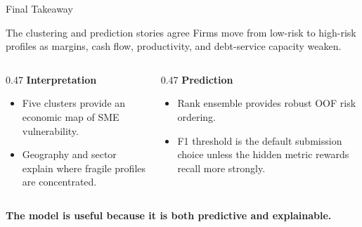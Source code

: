 \documentclass[aspectratio=169,10pt]{beamer}
\begin{document}
\begin{frame}{Final Takeaway}
  \begin{block}{The clustering and prediction stories agree}
    Firms move from low-risk to high-risk profiles as margins, cash flow,
    productivity, and debt-service capacity weaken.
  \end{block}

  \vspace{0.25cm}
  \begin{columns}[T,totalwidth=\textwidth]
    \begin{column}{0.47\textwidth}
      \textbf{Interpretation}
      \begin{itemize}
        \item Five clusters provide an economic map of SME vulnerability.
        \item Geography and sector explain where fragile profiles are concentrated.
      \end{itemize}
    \end{column}
    \begin{column}{0.47\textwidth}
      \textbf{Prediction}
      \begin{itemize}
        \item Rank ensemble provides robust OOF risk ordering.
        \item F1 threshold is the default submission choice unless the hidden metric
          rewards recall more strongly.
      \end{itemize}
    \end{column}
  \end{columns}

  \vspace{0.25cm}
  \centering
  \Large \textbf{The model is useful because it is both predictive and explainable.}
\end{frame}
\end{document}
